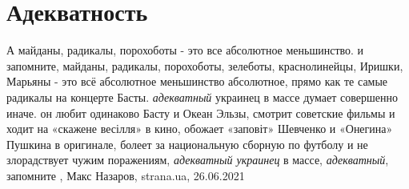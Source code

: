  
 
 
 
 
\chapter{Адекватность}
\label{sec:slova.adekvatnost}

А майданы, радикалы, порохоботы - это все абсолютное меньшинство.  и
запомните, майданы, радикалы, порохоботы, зелеботы, краснолинейцы, Иришки,
Марьяны - это всё абсолютное меньшинство абсолютное, прямо как те самые
радикалы на концерте Басты. \emph{адекватный} украинец в массе думает совершенно иначе.
он любит одинаково Басту и Океан Эльзы, смотрит советские фильмы и ходит на
«скажене весілля» в кино, обожает «заповіт» Шевченко и «Онегина» Пушкина в
оригинале, болеет за национальную сборную по футболу и не злорадствует чужим
поражениям, \emph{адекватный украинец} в массе, \emph{адекватный}, запомните
, Макс Назаров, strana.ua, 26.06.2021

